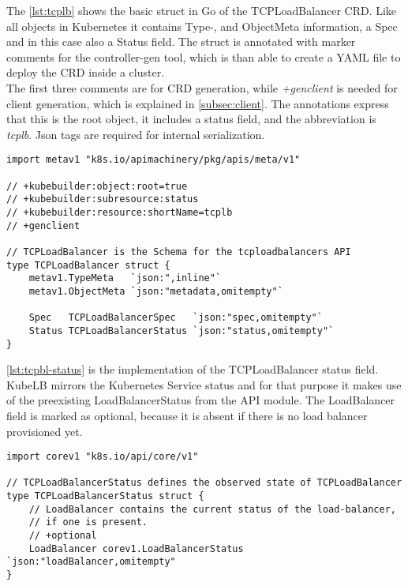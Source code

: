 The \autoref{lst:tcplb} shows the basic struct in Go of the TCPLoadBalancer CRD.
Like all objects in Kubernetes it contains Type-, and ObjectMeta information, a Spec and in this case also a Status field.
The struct is annotated with marker comments for the controller-gen tool, which is than able to create a YAML file to deploy the CRD inside a cluster.
\\
The first three comments are for CRD generation, while \textit{+genclient} is needed for client generation, which is explained in \autoref{subsec:client}.
The annotations express that this is the root object, it includes a status field, and the abbreviation is \textit{tcplb}.
Json tags are required for internal serialization.

\begin{lstlisting}[caption={TCPLoadBalancer CRD root struct},label={lst:tcplb}]
import metav1 "k8s.io/apimachinery/pkg/apis/meta/v1"

// +kubebuilder:object:root=true
// +kubebuilder:subresource:status
// +kubebuilder:resource:shortName=tcplb
// +genclient

// TCPLoadBalancer is the Schema for the tcploadbalancers API
type TCPLoadBalancer struct {
	metav1.TypeMeta   `json:",inline"`
	metav1.ObjectMeta `json:"metadata,omitempty"`

	Spec   TCPLoadBalancerSpec   `json:"spec,omitempty"`
	Status TCPLoadBalancerStatus `json:"status,omitempty"`
}
\end{lstlisting}

\newpage

\autoref{lst:tcpbl-status} is the implementation of the TCPLoadBalancer status field.
KubeLB mirrors the Kubernetes Service status and for that purpose it makes use of the preexisting LoadBalancerStatus from the API module.
The LoadBalancer field is marked as optional, because it is absent if there is no load balancer provisioned yet.

\begin{lstlisting}[caption={TCPLoadBalancerStatus struct}, label={lst:tcpbl-status}]
import corev1 "k8s.io/api/core/v1"

// TCPLoadBalancerStatus defines the observed state of TCPLoadBalancer
type TCPLoadBalancerStatus struct {
	// LoadBalancer contains the current status of the load-balancer,
	// if one is present.
	// +optional
	LoadBalancer corev1.LoadBalancerStatus `json:"loadBalancer,omitempty"
}
\end{lstlisting}

